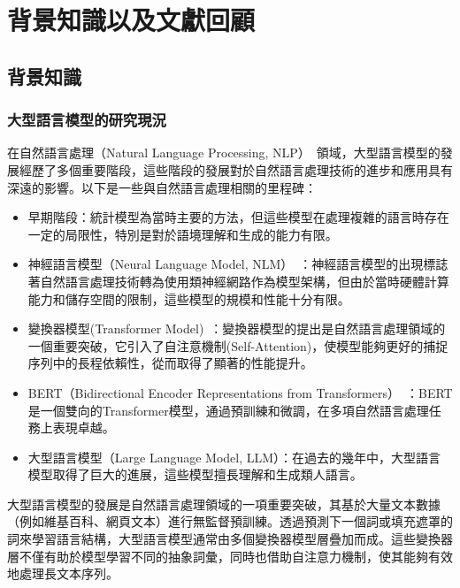 \documentclass[class=NCU_thesis, crop=false]{standalone}
\begin{document}
\chapter{背景知識以及文獻回顧}

\section{背景知識}
\subsection{大型語言模型的研究現況}

在自然語言處理（Natural Language Processing, NLP）~\cite{chowdhary2020natural}領域，大型語言模型的發展經歷了多個重要階段，這些階段的發展對於自然語言處理技術的進步和應用具有深遠的影響。以下是一些與自然語言處理相關的里程碑：

\begin{itemize}
    \item 早期階段：統計模型為當時主要的方法，但這些模型在處理複雜的語言時存在一定的局限性，特別是對於語境理解和生成的能力有限。

    \item 神經語言模型（Neural Language Model, NLM）~\cite{kim2016character}：神經語言模型的出現標誌著自然語言處理技術轉為使用類神經網路作為模型架構，但由於當時硬體計算能力和儲存空間的限制，這些模型的規模和性能十分有限。

    \item 變換器模型(Transformer Model)~\cite{wolf-etal-2020-transformers}：變換器模型的提出是自然語言處理領域的一個重要突破，它引入了自注意機制(Self-Attention)，使模型能夠更好的捕捉序列中的長程依賴性，從而取得了顯著的性能提升。

    \item BERT（Bidirectional Encoder Representations from Transformers）~\cite{devlin2019bert}：BERT是一個雙向的Transformer模型，通過預訓練和微調，在多項自然語言處理任務上表現卓越。

    \item 大型語言模型（Large Language Model, LLM）：在過去的幾年中，大型語言模型取得了巨大的進展，這些模型擅長理解和生成類人語言。
\end{itemize}


大型語言模型的發展是自然語言處理領域的一項重要突破，其基於大量文本數據（例如維基百科、網頁文本）進行無監督預訓練。透過預測下一個詞或填充遮罩的詞來學習語言結構，大型語言模型通常由多個變換器模型層疊加而成。這些變換器層不僅有助於模型學習不同的抽象詞彙，同時也借助自注意力機制，使其能夠有效地處理長文本序列。
\end{document}
